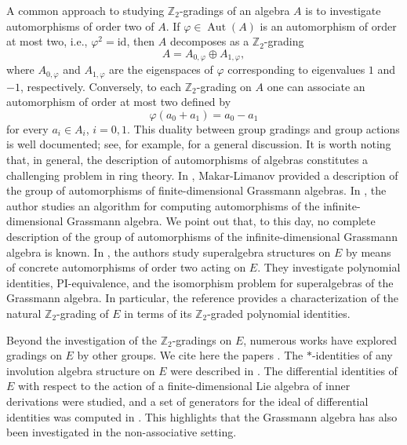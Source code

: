 \documentclass{article}
\begin{document}
	A common approach to studying $\mathbb{Z}_2$-gradings of an algebra $A$ is to investigate automorphisms of order two of $A$. If $\varphi \in \operatorname{Aut}(A)$ is an automorphism of order at most two, i.e., $\varphi^2 = \mathrm{id}$, then $A$ decomposes as a $\mathbb{Z}_2$-grading
	\[
	A = A_{0,\varphi} \oplus A_{1,\varphi},
	\]
	where $A_{0,\varphi}$ and $A_{1,\varphi}$ are the eigenspaces of $\varphi$ corresponding to eigenvalues $1$ and $-1$, respectively. Conversely, to each $\mathbb{Z}_2$-grading on $A$ one can associate an automorphism of order at most two defined by
	\[
	\varphi(a_0 + a_1) = a_0 - a_1
	\]
	for every $a_i \in A_i$, $i=0,1$. This duality between group gradings and group actions is well documented; see, for example, \cite{GMZ} for a general discussion. It is worth noting that, in general, the description of automorphisms of algebras constitutes a challenging problem in ring theory. In \cite{makar}, Makar-Limanov provided a description of the group of automorphisms of finite-dimensional Grassmann algebras. In \cite{AK}, the author studies an algorithm for computing automorphisms of the infinite-dimensional Grassmann algebra. We point out that, to this day, no complete description of the group of automorphisms of the infinite-dimensional Grassmann algebra is known. In \cite{agpkauto, anagomes}, the authors study superalgebra structures on $E$ by means of concrete automorphisms of order two acting on $E$. They investigate polynomial identities, PI-equivalence, and the isomorphism problem for superalgebras of the Grassmann algebra. In particular, the reference \cite{anagomes} provides a characterization of the natural $\mathbb{Z}_2$-grading of $E$ in terms of its $\mathbb{Z}_2$-graded polynomial identities.
	
	Beyond the investigation of the $\mathbb{Z}_2$-gradings on $E$, numerous works have explored gradings on $E$ by other groups. We cite here the papers \cite{centroneG, disilplamen, APzgrad, AGuim, ABC, ACP}. The $\ast$-identities of any involution algebra structure on $E$ were described in \cite{CDD}. The differential identities of 
	$E$ with respect to the action of a finite-dimensional Lie algebra  of inner derivations were studied, and a set of generators for the ideal of differential identities was computed in \cite{Rizzo}. This highlights that the Grassmann algebra has also been investigated in the non-associative setting.
	
	
	
	
	
	
	
\end{document}
